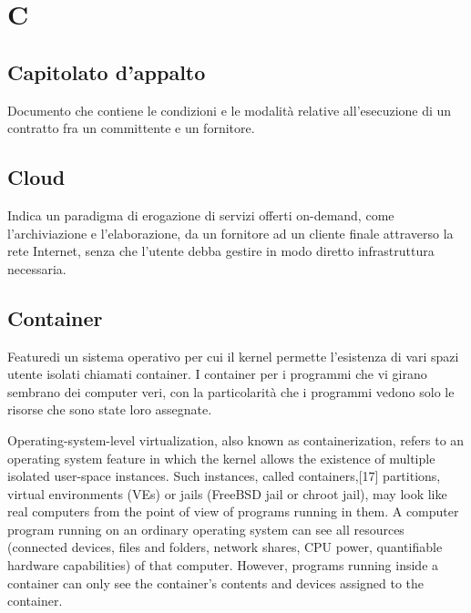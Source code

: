 \clearpage
\section*{C}

\subsection*{Capitolato d'appalto}
Documento che contiene le condizioni e le modalità relative all'esecuzione di un contratto fra un committente e un fornitore.


\subsection*{Cloud}
Indica un paradigma di erogazione di servizi offerti on-demand, come l'archiviazione e l'elaborazione, da un fornitore ad un cliente finale attraverso la rete Internet, senza che l'utente debba gestire in modo diretto infrastruttura necessaria.

\subsection*{Container}
Feature\glosp di un sistema operativo per cui il kernel permette l'esistenza di vari spazi utente isolati chiamati container. I container per i programmi che vi girano sembrano dei computer veri, con la particolarità che i programmi vedono solo le risorse che sono state loro assegnate.


Operating-system-level virtualization, also known as containerization, refers to an operating system feature in which the kernel allows the existence of multiple isolated user-space instances. Such instances, called containers,[17] partitions, virtual environments (VEs) or jails (FreeBSD jail or chroot jail), may look like real computers from the point of view of programs running in them. A computer program running on an ordinary operating system can see all resources (connected devices, files and folders, network shares, CPU power, quantifiable hardware capabilities) of that computer. However, programs running inside a container can only see the container's contents and devices assigned to the container. 

